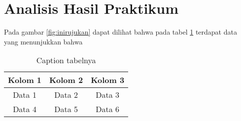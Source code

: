 \section*{Analisis Hasil Praktikum}
\indent
Pada gambar \ref{fig:inirujukan} dapat dilihat bahwa pada tabel \ref{tab:labelini} terdapat data yang menunjukkan bahwa \lipsum[1]
\lipsum[1-2]

\begin{table}[h]
    \centering
    \caption{Caption tabelnya}
    \label{tab:labelini}
    \begin{tabular}{|c|c|c|}
    \hline
    Kolom 1 & Kolom 2 & Kolom 3 \\
    \hline
    Data 1 & Data 2 & Data 3 \\
    Data 4 & Data 5 & Data 6 \\
    \hline
    \end{tabular}
\end{table}